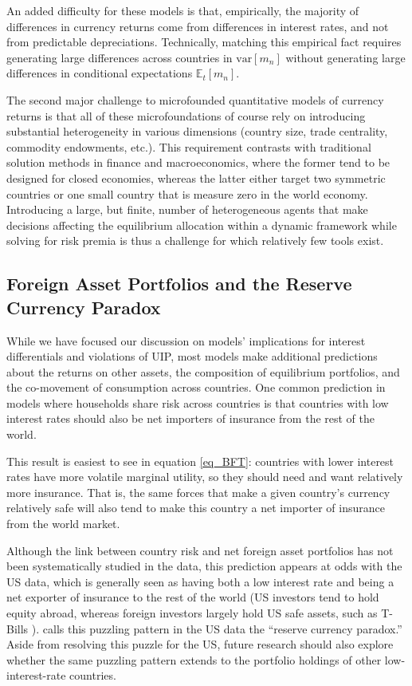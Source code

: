 \documentclass{ar-1col}
\begin{document}
An added difficulty for these models is that, empirically, the majority of differences in currency returns come from differences in interest rates, and not from predictable depreciations. Technically, matching this empirical fact requires generating large differences across countries in $\text{var}\left[ m_n \right]$ without generating large differences in conditional expectations $\mathbb{E}_t\left[ m_n \right]$. 

The second major challenge to microfounded quantitative models of currency returns is that all of these microfoundations of course rely on introducing substantial heterogeneity in various dimensions (country size, trade centrality, commodity endowments, etc.). This requirement contrasts with traditional solution methods in finance and macroeconomics, where the former tend to be designed for closed economies, whereas the latter either target two symmetric countries or one small country that is measure zero in the world economy. Introducing a large, but finite, number of heterogeneous agents that make decisions affecting the equilibrium allocation within a dynamic framework while solving for risk premia is thus a challenge for which relatively few tools exist. 

\begin{textbox}[h]
\section{Foreign Asset Portfolios and the Reserve Currency Paradox} While we have focused our discussion on models' implications for interest differentials and violations of UIP, most models make additional predictions about the returns on other assets, the composition of equilibrium portfolios, and the co-movement of consumption across countries. One common prediction in models where households share risk across countries is that countries with low interest rates should also be net importers of insurance from the rest of the world. 

This result is easiest to see in equation \ref{eq_BFT}: countries with lower interest rates have more volatile marginal utility, so they should need and want relatively more insurance. That is, the same forces that make a given country's currency relatively safe will also tend to make this country a net importer of insurance from the world market. 

Although the link between country risk and net foreign asset portfolios has not been systematically studied in the data, this prediction appears at odds with the US data, which is generally seen as having both a low interest rate and being a net exporter of insurance to the rest of the world (US investors tend to hold equity abroad, whereas foreign investors largely hold US safe assets, such as T-Bills \citep{GourinchasRey2007,GourinchasGovillotRey2017}). \cite{Maggiori2013} calls this puzzling pattern in the US data the ``reserve currency paradox.'' Aside from resolving this puzzle for the US, future research should also explore whether the same puzzling pattern extends to the portfolio holdings of other low-interest-rate countries. 
\end{textbox}
\end{document}
